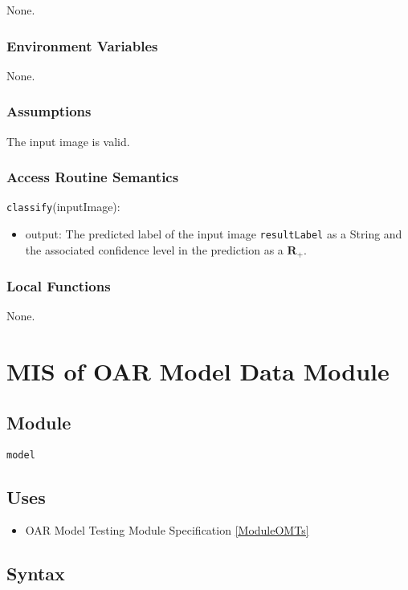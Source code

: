 \documentclass[12pt, titlepage]{article}
\def\code#1{\texttt{#1}}
\begin{document}
None.

\subsubsection{Environment Variables}

None.

\subsubsection{Assumptions}

The input image is valid.

\subsubsection{Access Routine Semantics}

\noindent \code{classify}(inputImage):
\begin{itemize}
\item output: The predicted label of the input image \code{resultLabel} as a String and the associated confidence level in the 
prediction as a $\mathbf{R}_{+}$.
\end{itemize}

\subsubsection{Local Functions}

None.

\section{MIS of OAR Model Data Module} \label{ModuleOMD} 

\subsection{Module}

\code{model}

\subsection{Uses}

\begin{itemize}
  \item OAR Model Testing Module Specification \ref{ModuleOMTs}
\end{itemize}

\subsection{Syntax}
\end{document}
